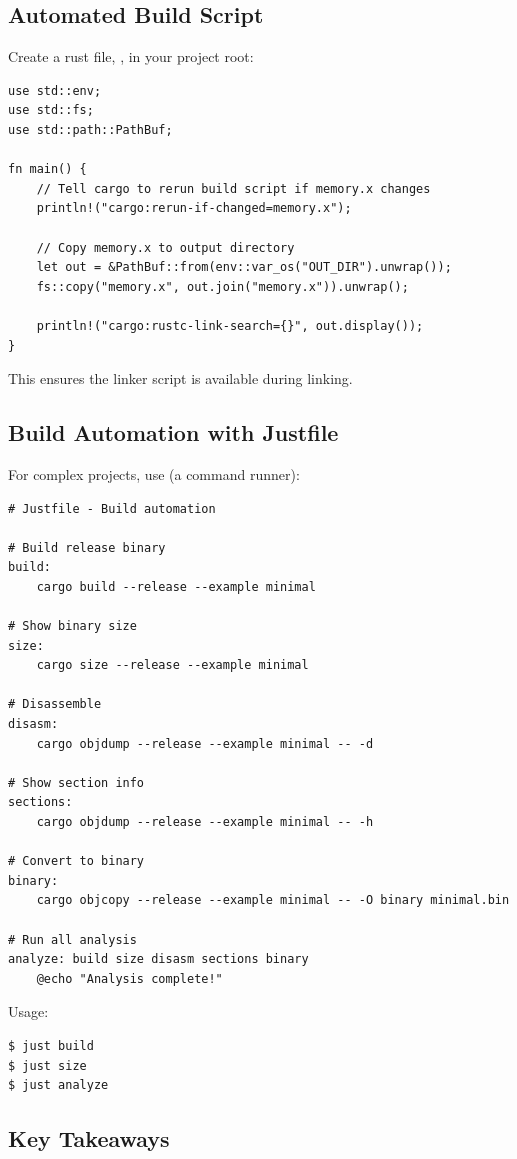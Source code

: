 \subsection{Automated Build Script}
\label{sec:automated-build}

Create a rust file, , in your project root:
\begin{verbatim}
use std::env;
use std::fs;
use std::path::PathBuf;

fn main() {
    // Tell cargo to rerun build script if memory.x changes
    println!("cargo:rerun-if-changed=memory.x");

    // Copy memory.x to output directory
    let out = &PathBuf::from(env::var_os("OUT_DIR").unwrap());
    fs::copy("memory.x", out.join("memory.x")).unwrap();

    println!("cargo:rustc-link-search={}", out.display());
}
\end{verbatim}

This ensures the linker script is available during linking.

\subsection{Build Automation with Justfile}
\label{sec:justfile}

For complex projects, use  (a command runner):
\begin{verbatim}
# Justfile - Build automation

# Build release binary
build:
    cargo build --release --example minimal

# Show binary size
size:
    cargo size --release --example minimal

# Disassemble
disasm:
    cargo objdump --release --example minimal -- -d

# Show section info
sections:
    cargo objdump --release --example minimal -- -h

# Convert to binary
binary:
    cargo objcopy --release --example minimal -- -O binary minimal.bin

# Run all analysis
analyze: build size disasm sections binary
    @echo "Analysis complete!"
\end{verbatim}

Usage:
\begin{verbatim}
$ just build
$ just size
$ just analyze
\end{verbatim}
\subsection{Key Takeaways}
\label{sec:ch1-key-takeaways}


